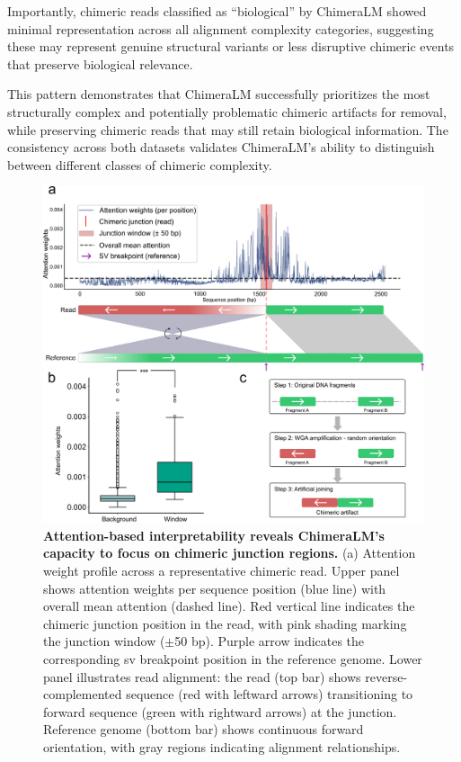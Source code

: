 \documentclass[pdflatex,sn-nature]{sn-jnl}%
\theoremstyle{thmstyleone}%
\theoremstyle{thmstyletwo}%
\theoremstyle{thmstylethree}%
\begin{document}
Importantly, chimeric reads classified as ``biological'' by ChimeraLM showed minimal representation across all alignment complexity categories, suggesting these may represent genuine structural variants or less disruptive chimeric events that preserve biological relevance.

This pattern demonstrates that ChimeraLM successfully prioritizes the most structurally complex and potentially problematic chimeric artifacts for removal, while preserving chimeric reads that may still retain biological information.
The consistency across both datasets validates ChimeraLM's ability to distinguish between different classes of chimeric complexity.

\begin{figure}[!ht]
	\begin{center}
		\includegraphics[width=\textwidth]{final_figures/figure4}
	\end{center}
	\caption{{\bf Attention-based interpretability reveals ChimeraLM's capacity to focus on chimeric junction regions.}
		(a) Attention weight profile across a representative chimeric read. Upper panel shows attention weights per sequence position (blue line) with overall mean attention (dashed line). Red vertical line indicates the chimeric junction position in the read, with pink shading marking the junction window ($\pm$50 bp). Purple arrow indicates the corresponding \gls{sv} breakpoint position in the reference genome. Lower panel illustrates read alignment: the read (top bar) shows reverse-complemented sequence (red with leftward arrows) transitioning to forward sequence (green with rightward arrows) at the junction. Reference genome (bottom bar) shows continuous forward orientation, with gray regions indicating alignment relationships.
}
\end{figure}
\end{document}
